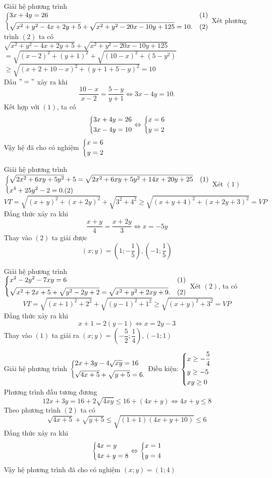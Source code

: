 \begin{ex}%
Giải hệ phương trình $\left\{\begin{aligned}&3x+4y=26  & (1)\\ &\sqrt{x^2+y^2-4x+2y+5}+ \sqrt{x^2+y^2-20x-10y+125}=10.&(2)\end{aligned}\right.$
\loigiai
{Xét phương trình $(2)$ ta có\\
$\displaystyle \sqrt{x^2+y^2-4x+2y+5}+ \sqrt{x^2+y^2-20x-10y+125}$\\
$\displaystyle =\sqrt{(x-2)^2+(y+1)^2}+ \sqrt{(10-x)^2+(5-y^2)} $ \\
$\geq \sqrt{(x+2+10-x)^2+(y+1+5-y)^2}=10$\\
Dấu $"="$ xảy ra khi $$\dfrac{10-x}{x-2}=\dfrac{5-y}{y+1} \Leftrightarrow 3x-4y=10.$$
Kết hợp với $(1)$, ta có $$\left\{\begin{aligned}&3x+4y=26\\&3x-4y=10\end{aligned}\right. \Leftrightarrow \left\{\begin{aligned}&x=6\\&y=2\end{aligned}\right.$$
Vậy hệ đã cho có nghiệm $\left\{\begin{aligned}x=6\\y=2\end{aligned}\right.$
}
\end{ex}
\begin{ex}%
Giải hệ phương trình $\left\{\begin{aligned}&\sqrt{2x^2+6xy+5y^2}+5=\sqrt{2x^2+6xy+5y^2+14x+20y+25} &(1)\\ & x^4+25y^2-2=0.(2)\end{aligned}\right.$
\loigiai
{Xét $(1)$
$$VT=\sqrt{(x+y)^2+(x+2y)^2}+\sqrt{3^2+4^2} \geq \sqrt{(x+y+4)^2+(x+2y+3)^2}=VP$$
Đẳng thức xảy ra khi $$\dfrac{x+y}{4}=\dfrac{x+2y}{3} \Leftrightarrow x= -5y$$
Thay vào $(2)$ ta giải được $$(x;y)=\left(1;-\dfrac{1}{5}\right),\left(-1;\dfrac{1}{5}\right)$$
}
\end{ex}
\begin{ex}%
Giải hệ phương trình $\left\{\begin{aligned}&x^2-2y^2-7xy=6 &(1) \\  &\sqrt{x^2+2x+5}+ \sqrt{y^2-2y+2}= \sqrt{x^2+y^2+2xy+9}.&(2)\end{aligned}\right.$
\loigiai
{Xét $(2)$, ta có
$$VT= \sqrt{(x+1)^2+2^2}+ \sqrt{(y-1)^2+1^2} \geq \sqrt{(x+y)^2+3^2}=VP$$
Đẳng thức xảy ra khi $$x+1=2(y-1) \Leftrightarrow x= 2y-3$$
Thay vào $(1)$ ta giải ra $(x;y)=(-\dfrac{5}{2};\dfrac{1}{4}),(-1;1)$
}
\end{ex}
\begin{ex}%
Giải hệ phương trình $\left\{\begin{aligned}&2x+3y-4\sqrt{xy}=16 \\ &\sqrt{4x+5}+ \sqrt{y+5}=6.\end{aligned}\right.$
\loigiai
{Điều kiện: $\left\{\begin{aligned}&x \geq -\dfrac{5}{4}\\& y \geq -5 \\& xy \geq 0\end{aligned}\right.$\\
Phương trình đầu tương đương
$$12x+3y=16+2 \sqrt{4xy} \leq 16 + (4x+y) \Leftrightarrow 4x+y \leq 8$$
Theo phương trình $(2)$ ta có 
$$\sqrt{4x+5}+\sqrt{y+5} \leq \sqrt{(1+1)(4x+y+10)} \leq 6$$
Đẳng thức xảy ra khi $$\left\{\begin{aligned}&4x=y\\&4x+y=8\end{aligned}\right. \Leftrightarrow \left\{\begin{aligned}&x=1\\&y=4\end{aligned}\right.$$
Vậy hệ phương trình đã cho có nghiệm $(x;y)=(1;4)$
}
\end{ex}


